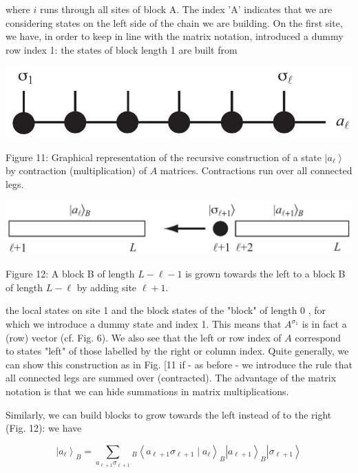 \documentclass[12pt]{article}
\begin{document}
where $i$ runs through all sites of block A. The index 'A' indicates that we are considering states on the left side of the chain we are building. On the first site, we have, in order to keep in line with the matrix notation, introduced a dummy row index 1: the states of block length 1 are built from

\begin{center}
\includegraphics[max width=\textwidth]{2024_05_04_afc4ad226da9ccfe0ac8g-027(2)}
\end{center}

Figure 11: Graphical representation of the recursive construction of a state $\left|a_{\ell}\right\rangle$ by contraction (multiplication) of $A$ matrices. Contractions run over all connected legs.

\begin{center}
\includegraphics[max width=\textwidth]{2024_05_04_afc4ad226da9ccfe0ac8g-027}
\end{center}

Figure 12: A block B of length $L-\ell-1$ is grown towards the left to a block B of length $L-\ell$ by adding site $\ell+1$.

the local states on site 1 and the block states of the "block" of length 0 , for which we introduce a dummy state and index 1. This means that $A^{\sigma_{1}}$ is in fact a (row) vector (cf. Fig. 6). We also see that the left or row index of $A$ correspond to states "left" of those labelled by the right or column index. Quite generally, we can show this construction as in Fig. [11 if - as before - we introduce the rule that all connected legs are summed over (contracted). The advantage of the matrix notation is that we can hide summations in matrix multiplications.

Similarly, we can build blocks to grow towards the left instead of to the right (Fig. 12): we have


\begin{equation*}
\left|a_{\ell}\right\rangle_{B}=\sum_{a_{\ell+1} \sigma_{\ell+1}}{ }_{B}\left\langle a_{\ell+1} \sigma_{\ell+1} \mid a_{\ell}\right\rangle_{B}\left|a_{\ell+1}\right\rangle_{B}\left|\sigma_{\ell+1}\right\rangle \tag{64}
\end{equation*}
\end{document}
